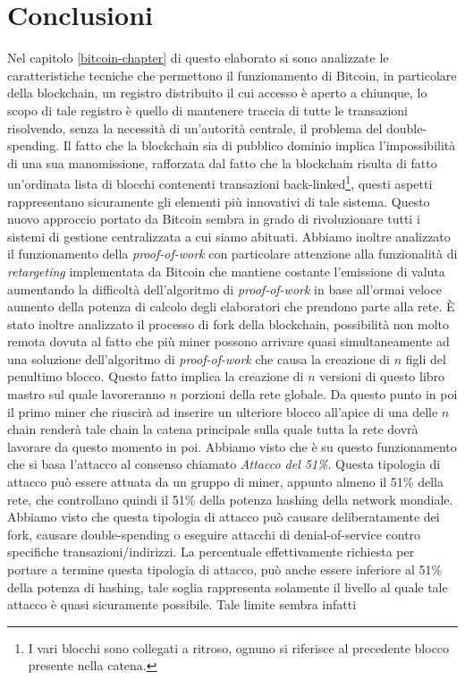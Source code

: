 
\cleardoublepage
{}

\chapter{Conclusioni}
Nel capitolo \ref{bitcoin-chapter} di questo elaborato si sono analizzate le caratteristiche tecniche che permettono il funzionamento di Bitcoin, in particolare della blockchain, un registro distribuito il cui accesso è aperto a chiunque, lo scopo di tale registro è quello di mantenere traccia di tutte le transazioni risolvendo, senza la necessità di un’autorità centrale, il problema del double-spending. Il fatto che la blockchain sia di pubblico dominio implica l’impossibilità di una sua manomissione, rafforzata dal fatto che la blockchain risulta di fatto un'ordinata lista di blocchi contenenti transazioni back-linked\footnote{I vari blocchi sono collegati a ritroso, ognuno si riferisce al precedente blocco presente nella catena.}, questi aspetti rappresentano sicuramente gli elementi più innovativi di tale sistema. Questo nuovo approccio portato da Bitcoin sembra in grado di rivoluzionare tutti i sistemi di gestione centralizzata a cui siamo abituati. Abbiamo inoltre analizzato il funzionamento della \textit{proof-of-work} con particolare attenzione alla funzionalità di \textit{retargeting} implementata da Bitcoin che mantiene costante l'emissione di valuta aumentando la difficoltà dell'algoritmo di \textit{proof-of-work} in base all'ormai veloce aumento della potenza di calcolo degli elaboratori che prendono parte alla rete. \`E stato inoltre analizzato il processo di fork della blockchain, possibilità non molto remota dovuta al fatto che più miner possono arrivare quasi simultaneamente ad una soluzione dell'algoritmo di \textit{proof-of-work} che causa la creazione di $n$ figli del penultimo blocco. Questo fatto implica la creazione di $n$ versioni di questo libro mastro sul quale lavoreranno $n$ porzioni della rete globale. Da questo punto in poi il primo miner che riuscirà ad inserire un ulteriore blocco all'apice di una delle $n$ chain renderà tale chain la catena principale sulla quale tutta la rete dovrà lavorare da questo momento in poi. Abbiamo visto che è su questo funzionamento che si basa l'attacco al consenso chiamato \textit{Attacco del 51\%}. Questa tipologia di attacco può essere attuata da un gruppo di miner, appunto almeno il 51\% della rete, che controllano quindi il 51\% della potenza hashing della network mondiale. Abbiamo visto che questa tipologia di attacco può causare deliberatamente dei fork, causare double-spending o eseguire attacchi di denial-of-service contro specifiche transazioni/indirizzi. La percentuale effettivamente richiesta per portare a termine questa tipologia di attacco, può anche essere inferiore al 51\% della potenza di hashing, tale soglia rappresenta solamente il livello al quale tale attacco è quasi sicuramente possibile. Tale limite sembra infatti 